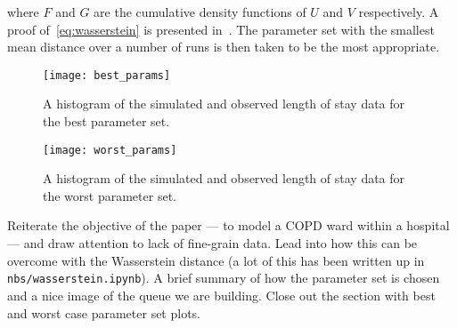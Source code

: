 \noindent where \(F\) and \(G\) are the cumulative density functions of \(U\)
and \(V\) respectively. A proof of~\eqref{eq:wasserstein} is presented
in~\cite{RTC17}. The parameter set with the smallest mean distance over a
number of runs is then taken to be the most appropriate.

\begin{figure}
    \centering%
    \texttt{[image: best\_params]}
    \caption{A histogram of the simulated and observed length of stay data for
             the best parameter set.}\label{fig:best_params}
\end{figure}

\begin{figure}
    \centering%
    \texttt{[image: worst\_params]}
    \caption{A histogram of the simulated and observed length of stay data for
             the worst parameter set.}\label{fig:worst_params}
\end{figure}

Reiterate the objective of the paper --- to model a COPD ward within a hospital
--- and draw attention to lack of fine-grain data. Lead into how this can be
overcome with the Wasserstein distance (a lot of this has been written up in
\texttt{nbs/wasserstein.ipynb}). A brief summary of how the parameter set is
chosen and a nice image of the queue we are building. Close out the section with
best and worst case parameter set plots.
